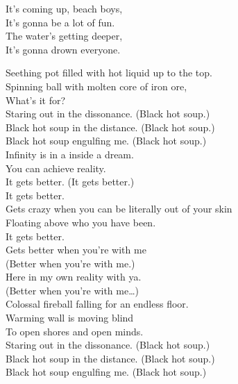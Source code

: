 It's coming up, beach boys, \\
It's gonna be a lot of fun. \\
The water's getting deeper, \\
It's gonna drown everyone. \\





Seething pot filled with hot liquid up to the top. \\
Spinning ball with molten core of iron ore, \\
What's it for? \\

Staring out in the dissonance. (Black hot soup.) \\
Black hot soup in the distance. (Black hot soup.) \\
Black hot soup engulfing me. (Black hot soup.) \\

Infinity is in a  inside a dream. \\
You can achieve reality. \\
It gets better. (It gets better.) \\
It gets better. \\
Gets crazy when you can be literally out of your skin \\
Floating above who you have been. \\
It gets better. \\
Gets better when you're with me \\
(Better when you're with me.) \\
Here in my own reality with ya. \\
(Better when you're with me…) \\

Colossal fireball falling for an endless floor. \\
Warming wall is moving blind \\
To open shores and open minds. \\

Staring out in the dissonance. (Black hot soup.) \\
Black hot soup in the distance. (Black hot soup.) \\
Black hot soup engulfing me. (Black hot soup.) \\


